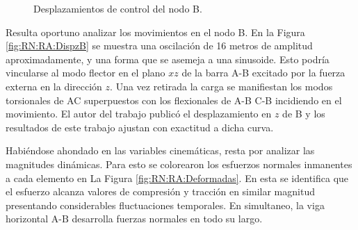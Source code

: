 \begingroup
\centering
\begin{figure}[htbp]
	\centering
	\caption{Desplazamientos de control del nodo B.} \label{fig:RN:RA:DispsB}
\end{figure}
\endgroup

Resulta oportuno analizar los movimientos en el nodo B. En la Figura \ref{fig:RN:RA:DispzB} se muestra una oscilación de 16 metros de amplitud aproximadamente, y una forma que se asemeja a una sinusoide. Esto podría vincularse al modo flector en el plano $xz$ de la barra A-B excitado por la fuerza externa en la dirección $z$. Una vez retirada la carga se manifiestan los modos torsionales de AC superpuestos con los flexionales de A-B C-B incidiendo en el movimiento. El autor del trabajo \textcite{Le2014} publicó el desplazamiento en $z$ de B y los resultados de este trabajo ajustan con exactitud a dicha curva. 

Habiéndose ahondado en las variables cinemáticas, resta por analizar las magnitudes dinámicas. Para esto se colorearon los esfuerzos normales inmanentes a cada elemento en La Figura \ref{fig:RN:RA:Deformadas}. En esta se identifica que el esfuerzo alcanza valores de compresión y tracción en similar magnitud presentando considerables fluctuaciones temporales. En simultaneo, la viga horizontal $\text{A-B}$ desarrolla fuerzas normales en todo su largo. 


